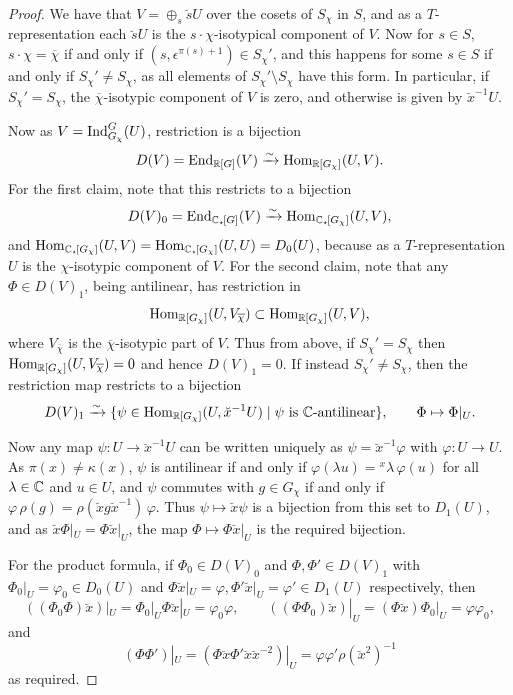 \begin{proof}
  We have that $V = \oplus_s \breve{s} U$ over the cosets of $S_{\chi}$ in $S$, and as a $T$-representation each $\breve{s} U$ is the $s \cdot \chi$-isotypical component of $V$. 
  Now for $s \in S$, $s \cdot \chi = \overline{\chi}$ if and only if $(s, \epsilon^{\pi(s) + 1}) \in S_{\chi}'$, and this happens for some $s \in S$ if and only if $S_{\chi}' \neq S_{\chi}$, as all elements of $S_{\chi}' \setminus S_{\chi}$ have this form. In particular, if $S_{\chi}' = S_{\chi}$, the $\overline{\chi}$-isotypic component of $V$ is zero, and otherwise is given by $\breve{x}^{-1} U$.

  Now as $V = \operatorname{Ind}_{G_{\chi}}^G(U)$, restriction is a bijection
  \[
  D(V) = \operatorname{End}_{{\mathbb R}[G]}(V) \xrightarrow{\sim} \operatorname{Hom}_{{\mathbb R}[G_{\chi}]}(U,V).
  \]
  For the first claim, note that this restricts to a bijection 
  \[
  D(V)_0 = \operatorname{End}_{{\mathbb C}_{\star \hspace{-0.1em}}[G]}(V) \xrightarrow{\sim} \operatorname{Hom}_{{\mathbb C}_{\star \hspace{-0.1em}}[G_{\chi}]}(U,V),
  \]
  and $\operatorname{Hom}_{{\mathbb C}_{\star \hspace{-0.1em}}[G_{\chi}]}(U,V) = \operatorname{Hom}_{{\mathbb C}_{\star \hspace{-0.1em}}[G_{\chi}]}(U,U) = D_0(U)$, because as a $T$-representation $U$ is the $\chi$-isotypic component of $V$. For the second claim, note that any $\Phi \in D(V)_1$, being antilinear, has restriction in 
  \[
  \operatorname{Hom}_{{\mathbb R}[G_{\chi}]}(U,V_{\overline{\chi}}) \subset \operatorname{Hom}_{{\mathbb R}[G_{\chi}]}(U,V),
  \]
  where $V_{\overline{\chi}}$ is the $\overline{\chi}$-isotypic part of $V$. Thus from above, if $S_{\chi}' = S_{\chi}$ then $\operatorname{Hom}_{{\mathbb R}[G_{\chi}]}(U, V_{\overline{\chi}}) = 0$ and hence $D(V)_1 = 0$. If instead $S_{\chi}' \neq S_{\chi}$, then the restriction map restricts to a bijection 
  \[
  D(V)_1 \xrightarrow{\sim} \{ \psi \in \operatorname{Hom}_{{\mathbb R}[G_{\chi}]}(U, \breve{x}^{-1} U) \mid \psi \text{ is ${\mathbb C}$-antilinear}\}, \qquad \Phi \mapsto \Phi|_U.
  \]

   Now any map $\psi \colon U \rightarrow \breve{x}^{-1} U$ can be written uniquely as $\psi = \breve{x}^{-1} \varphi$ with $\varphi \colon U \rightarrow U$. As $\pi(x) \neq \kappa(x)$, $\psi$ is antilinear if and only if $\varphi(\lambda u) = {}^{x}\lambda \, \varphi(u)$ for all $\lambda \in {\mathbb C}$ and $u \in U$, and $\psi$ commutes with $g \in G_{\chi}$ if and only if $\varphi \, \rho(g) = \rho(\breve{x} g \breve{x}^{-1}) \, \varphi$. Thus $\psi \mapsto \breve{x} \psi$ is a bijection from this set to $D_1(U)$, and as $\breve{x} \Phi|_U = \Phi \breve{x}|_U$, the map $\Phi \mapsto \Phi \breve{x} |_U$ is the required bijection.
  
  For the product formula, if $\Phi_0 \in D(V)_0$ and $\Phi, \Phi' \in D(V)_1$ with $\Phi_0|_U = \varphi_0 \in D_0(U)$ and $\Phi \breve{x}|_U = \varphi, \Phi' \breve{x}|_U =\varphi' \in D_1(U)$ respectively, then
  \[
  ((\Phi_0\Phi) \breve{x})|_U = \Phi_0|_U \Phi \breve{x}|_U = \varphi_0 \varphi, \qquad ((\Phi \Phi_0) \breve{x})|_U = (\Phi \breve{x}) \Phi_0|_U = \varphi \varphi_0,
  \]
  and
  \[
  (\Phi \Phi')|_U = (\Phi \breve{x} \Phi' \breve{x} \breve{x}^{-2})|_U = \varphi \varphi' \rho(\breve{x}^2)^{-1}
  \]
  as required.
\end{proof}
